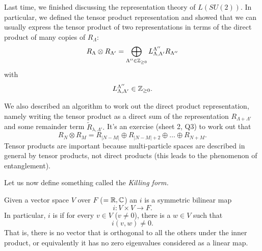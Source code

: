 Last time, we finished discussing the representation theory of $L(SU(2))$. In particular, we defined the tensor product representation and showed that we can usually express the tensor product of two representations in terms of the direct product of many copies of $R_{\Lambda}$:
$$R_\Lambda \otimes R_{\Lambda'}=\bigoplus_{\Lambda'' \in \mathbb{Z}_{\geq 0}} L^{\Lambda''}_{\Lambda,\Lambda'}R_{\Lambda''}$$
with $$L^{\Lambda''}_{\Lambda,\Lambda'}\in \mathbb{Z}_{\geq 0}.$$

We also described an algorithm to work out the direct product representation, namely writing the tensor product as a direct sum of the representation $R_{\Lambda+\Lambda'}$ and some remainder term $\tilde R_{\lambda,\Lambda'}.$ It's an exercise (sheet 2, Q3) to work out that
$$R_N\otimes R_M = R_{|N-M|}\oplus R_{|N-M|+2} \oplus\ldots \oplus R_{N+M}.$$
Tensor products are important because multi-particle spaces are described in general by tensor products, not direct products (this leads to the phenomenon of entanglement).

Let us now define something called the \emph{Killing form.}
\begin{defn}
Given a vector space $V$ over $F$ ($=\mathbb{R},\mathbb{C}$) an  $i$ is a symmetric bilinear map
$$i:V\times V \to F.$$
In particular, $i$ is  if for every $v\in V$ ($v\neq 0$), there is a $w\in V$ such that
$$i(v,w)\neq 0.$$ That is, there is no vector that is orthogonal to all the others under the inner product, or equivalently it has no zero eigenvalues considered as a linear map.
\end{defn}


